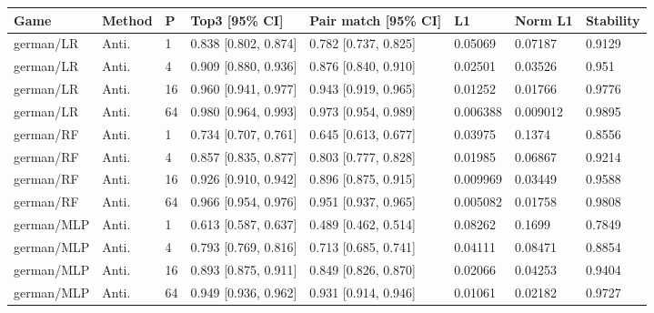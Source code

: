\begingroup\footnotesize\setlength{\tabcolsep}{3pt}
\begin{tabular}{llllllll}
\toprule
Game & Method & P & Top3 [95\% CI] & Pair match [95\% CI] & L1 & Norm L1 & Stability \\
\midrule
german/LR & Anti. & 1 & 0.838 [0.802, 0.874] & 0.782 [0.737, 0.825] & 0.05069 & 0.07187 & 0.9129 \\
german/LR & Anti. & 4 & 0.909 [0.880, 0.936] & 0.876 [0.840, 0.910] & 0.02501 & 0.03526 & 0.951 \\
german/LR & Anti. & 16 & 0.960 [0.941, 0.977] & 0.943 [0.919, 0.965] & 0.01252 & 0.01766 & 0.9776 \\
german/LR & Anti. & 64 & 0.980 [0.964, 0.993] & 0.973 [0.954, 0.989] & 0.006388 & 0.009012 & 0.9895 \\
german/RF & Anti. & 1 & 0.734 [0.707, 0.761] & 0.645 [0.613, 0.677] & 0.03975 & 0.1374 & 0.8556 \\
german/RF & Anti. & 4 & 0.857 [0.835, 0.877] & 0.803 [0.777, 0.828] & 0.01985 & 0.06867 & 0.9214 \\
german/RF & Anti. & 16 & 0.926 [0.910, 0.942] & 0.896 [0.875, 0.915] & 0.009969 & 0.03449 & 0.9588 \\
german/RF & Anti. & 64 & 0.966 [0.954, 0.976] & 0.951 [0.937, 0.965] & 0.005082 & 0.01758 & 0.9808 \\
german/MLP & Anti. & 1 & 0.613 [0.587, 0.637] & 0.489 [0.462, 0.514] & 0.08262 & 0.1699 & 0.7849 \\
german/MLP & Anti. & 4 & 0.793 [0.769, 0.816] & 0.713 [0.685, 0.741] & 0.04111 & 0.08471 & 0.8854 \\
german/MLP & Anti. & 16 & 0.893 [0.875, 0.911] & 0.849 [0.826, 0.870] & 0.02066 & 0.04253 & 0.9404 \\
german/MLP & Anti. & 64 & 0.949 [0.936, 0.962] & 0.931 [0.914, 0.946] & 0.01061 & 0.02182 & 0.9727 \\
\bottomrule
\end{tabular}

\endgroup
